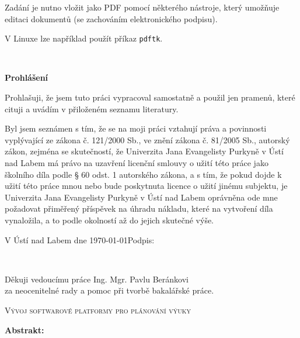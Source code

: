 \documentclass[male,czech,api_bc]{kitheses}
\newcommand{\nazevcz}{Vývoj softwarové platformy pro plánování výuky}        %
\newcommand{\vedouciDAT}{Ing. Mgr. Pavlu Beránkovi}
\begin{document}
Zadání je nutno vložit jako PDF pomocí některého nástroje, který umožňuje editaci dokumentů (se zachováním
elektronického podpisu).

V Linuxe lze například použít příkaz \texttt{pdftk}.

\clearpage
\thispagestyle{empty}
\afterpage{\nopagecolor}
~
\clearpage

\thispagestyle{empty} 
{\bfseries Prohlášení}

\vspace{0.5cm}
Prohlašuji, že jsem tuto  práci vypracoval
samostatně a použil
jen pramenů, které cituji a uvádím v přiloženém seznamu literatury.

\vspace{0.5em}

Byl jsem seznámen 
s tím, že se na moji práci vztahují práva a povinnosti vyplývající ze
zákona č. 121/2000 Sb., ve znění zákona č. 81/2005 Sb., autorský zákon, zejména se
skutečností, že Univerzita Jana Evangelisty Purkyně v Ústí nad Labem má právo na uzavření
licenční smlouvy o užití této práce jako školního díla podle § 60 odst. 1 autorského zákona, a
s tím, že pokud dojde k užití této práce mnou nebo bude poskytnuta licence o užití jinému
subjektu, je Univerzita Jana Evangelisty Purkyně v Ústí nad Labem oprávněna ode mne
požadovat přiměřený příspěvek na úhradu nákladu, které na vytvoření díla vynaložila, a to
podle okolností až do jejich skutečné výše.

\vspace{2em}

V Ústí nad Labem dne \today   \hfill Podpis: \makebox[4cm][s]{\dotfill}

\cleardoublepage
\thispagestyle{empty}
~
\vfill

\begin{flushright}
    Děkuji vedoucímu práce {\vedouciDAT}\\ 
    za neocenitelné rady a pomoc při tvorbě bakalářské práce.
\end{flushright}

\cleardoublepage

\textsc{\nazevcz}

\textbf{Abstrakt:}
\end{document}
